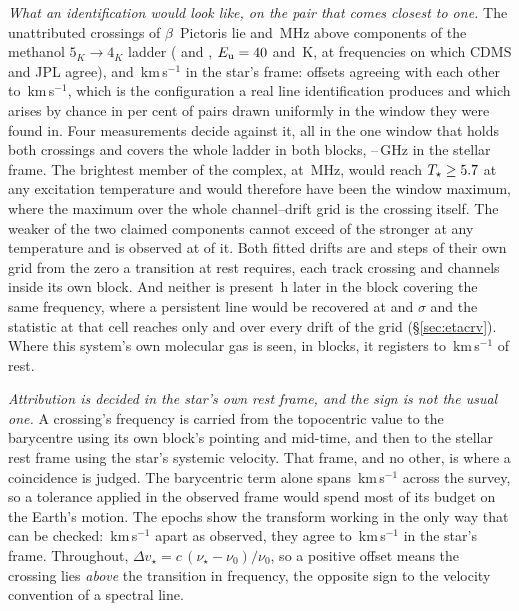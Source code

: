 \emph{What an identification would look like, on the pair that comes closest
to one.} The \ZmNCross{} unattributed crossings of $\beta$~Pictoris lie
\ZmOffLoMHz{} and \ZmOffHiMHz\,MHz above components of the methanol
$5_K\to4_K$ ladder (\ZmCompLo{} and \ZmCompHi, $E_{\rm u}=40$ and
\ZmEuHi\,K, at frequencies on which CDMS and JPL agree), \ZmDvLo{} and
\ZmDvHi\,km\,s$^{-1}$ in the star's frame: offsets agreeing with each other
to \ZmDvAgree\,km\,s$^{-1}$, which is the configuration a real line
identification produces and which arises by chance in \ZmChancePct{} per cent
of pairs drawn uniformly in the window they were found in. Four measurements
decide against it, all in the one window that holds both crossings and covers
the whole ladder in both blocks, \ZmBandLo--\ZmBandHi\,GHz in the stellar
frame. The brightest member of the complex, \ZmBright{} at
\ZmBrightMHz\,MHz, would reach $T_\star\ge5.7$ at any excitation
temperature and would therefore have been the window maximum, where the
maximum over the whole channel--drift grid is the crossing itself. The weaker
of the two claimed components cannot exceed \ZmRatioMax{} of the stronger at
any temperature and is observed at \ZmRatioObs{} of it. Both fitted drifts
are \ZmStepsLo{} and \ZmStepsHi{} steps of their own grid from the zero a
transition at rest requires, each track crossing \ZmSweepLo{} and
\ZmSweepHi{} channels inside its own block. And neither is present
\ZmGapH\,h later in the block covering the same frequency, where a persistent
line would be recovered at \ZmPersLo{} and \ZmPersHi$\sigma$ and the
statistic at that cell reaches only \ZmAnyLo{} and \ZmAnyHi{} over every
drift of the grid (\S\ref{sec:etacrv}). Where this system's own molecular gas
is seen, in \ZmCoNBlock{} blocks, it registers to \ZmCoReg\,km\,s$^{-1}$ of
rest.

\emph{Attribution is decided in the star's own rest frame, and the sign is
not the usual one.} A crossing's frequency is carried from the topocentric
value to the barycentre using its own block's pointing and mid-time, and then
to the stellar rest frame using the star's systemic velocity. That frame, and
no other, is where a coincidence is judged.
The barycentric term alone spans \FrBarySwing\,km\,s$^{-1}$ across the
survey, so a tolerance applied in the observed frame would spend most of its
budget on the Earth's motion. The \FrEpochNEpoch{} \FrEpochStar{} epochs show
the transform working in the only way that can be checked:
\FrEpochTopoKms\,km\,s$^{-1}$ apart as observed, they agree to
\FrEpochStelKms\,km\,s$^{-1}$ in the star's frame.
Throughout, $\Delta v_\star = c\,(\nu_\star-\nu_0)/\nu_0$, so a positive
offset means the crossing lies \emph{above} the transition
in frequency, the opposite sign to the velocity convention of a spectral line.


